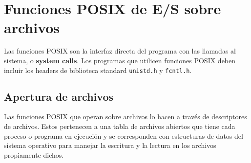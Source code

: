 % 

\section{Funciones POSIX de E/S sobre archivos}
\label{subsec:esarchivosposix}

Las funciones POSIX son la interfaz directa del programa con las llamadas al
sistema, o \textbf{system calls}. Los programas que utilicen funciones POSIX deben incluir los headers de
biblioteca standard \lstinline{unistd.h} y \lstinline{fcntl.h}.
 

\subsection{Apertura de archivos}
Las funciones POSIX que operan sobre archivos lo hacen
a través de descriptores de archivos. Estos pertenecen a una tabla de archivos
abiertos que tiene cada proceso o programa en ejecución y se corresponden con
estructuras de datos del sistema operativo para manejar la escritura y la
lectura en los archivos propiamente dichos.

